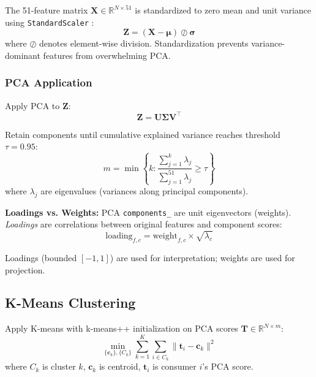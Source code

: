 The 51-feature matrix $\mathbf{X} \in \mathbb{R}^{N \times 51}$ is standardized to zero mean and unit variance using \texttt{StandardScaler} \cite{pedregosa2011scikit}:
\begin{equation}
\mathbf{Z} = (\mathbf{X} - \boldsymbol{\mu}) \oslash \boldsymbol{\sigma}
\end{equation}
where $\oslash$ denotes element-wise division. Standardization prevents variance-dominant features from overwhelming PCA.

\subsubsection{PCA Application}

Apply PCA to $\mathbf{Z}$:
\begin{equation}
\mathbf{Z} = \mathbf{U} \boldsymbol{\Sigma} \mathbf{V}^\top
\end{equation}

Retain components until cumulative explained variance reaches threshold $\tau = 0.95$:
\begin{equation}
m = \min \left\{ k : \frac{\sum_{j=1}^{k} \lambda_j}{\sum_{j=1}^{51} \lambda_j} \geq \tau \right\}
\end{equation}
where $\lambda_j$ are eigenvalues (variances along principal components).

\textbf{Loadings vs. Weights:} PCA \texttt{components\_} are unit eigenvectors (weights). \emph{Loadings} are correlations between original features and component scores:
\begin{equation}
\text{loading}_{f,c} = \text{weight}_{f,c} \times \sqrt{\lambda_c}
\end{equation}

Loadings (bounded $[-1, 1]$) are used for interpretation; weights are used for projection.

\subsection{K-Means Clustering}
\label{sec:kmeans}

Apply K-means \cite{lloyd1982least} with k-means++ initialization \cite{arthur2007kmeans} on PCA scores $\mathbf{T} \in \mathbb{R}^{N \times m}$:
\begin{equation}
\min_{\{\mathbf{c}_k\}, \{C_k\}} \sum_{k=1}^{K} \sum_{i \in C_k} \| \mathbf{t}_i - \mathbf{c}_k \|^2
\end{equation}
where $C_k$ is cluster $k$, $\mathbf{c}_k$ is centroid, $\mathbf{t}_i$ is consumer $i$'s PCA score.

